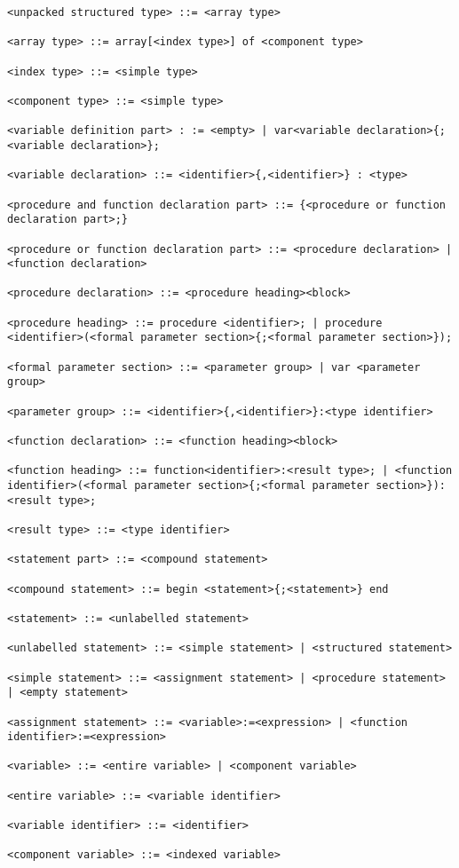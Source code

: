 \documentclass[a4paper,oneside]{report}
\begin{document}
\begin{verbatim}
<unpacked structured type> ::= <array type>

<array type> ::= array[<index type>] of <component type>

<index type> ::= <simple type>

<component type> ::= <simple type>

<variable definition part> : := <empty> | var<variable declaration>{;<variable declaration>};

<variable declaration> ::= <identifier>{,<identifier>} : <type>

<procedure and function declaration part> ::= {<procedure or function declaration part>;}

<procedure or function declaration part> ::= <procedure declaration> | <function declaration>

<procedure declaration> ::= <procedure heading><block>

<procedure heading> ::= procedure <identifier>; | procedure <identifier>(<formal parameter section>{;<formal parameter section>});

<formal parameter section> ::= <parameter group> | var <parameter group>

<parameter group> ::= <identifier>{,<identifier>}:<type identifier>

<function declaration> ::= <function heading><block>

<function heading> ::= function<identifier>:<result type>; | <function identifier>(<formal parameter section>{;<formal parameter section>}):<result type>;

<result type> ::= <type identifier>

<statement part> ::= <compound statement>

<compound statement> ::= begin <statement>{;<statement>} end

<statement> ::= <unlabelled statement>

<unlabelled statement> ::= <simple statement> | <structured statement>

<simple statement> ::= <assignment statement> | <procedure statement> | <empty statement>

<assignment statement> ::= <variable>:=<expression> | <function identifier>:=<expression>

<variable> ::= <entire variable> | <component variable>

<entire variable> ::= <variable identifier>

<variable identifier> ::= <identifier>

<component variable> ::= <indexed variable>


\end{verbatim}
\end{document}
